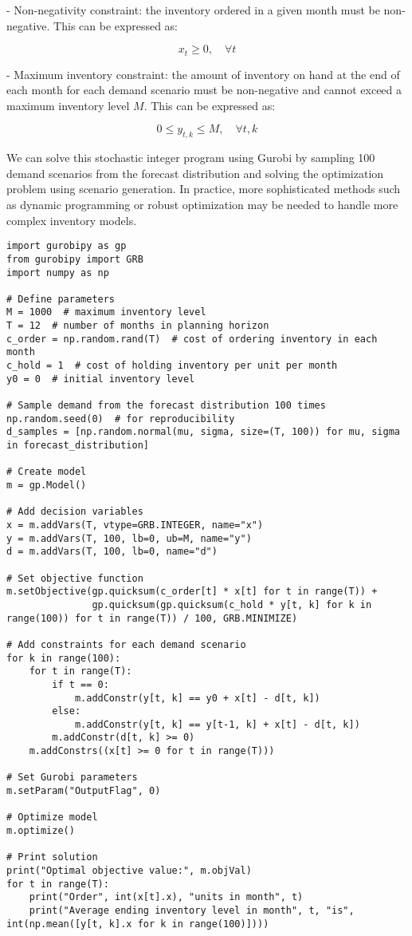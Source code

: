 - Non-negativity constraint: the inventory ordered in a given month must be non-negative. This can be expressed as:

$$x_t \geq 0, \quad \forall t$$

- Maximum inventory constraint: the amount of inventory on hand at the end of each month for each demand scenario must be non-negative and cannot exceed a maximum inventory level $M$. This can be expressed as:

$$0 \leq y_{t,k} \leq M, \quad \forall t, k$$

We can solve this stochastic integer program using Gurobi by sampling 100 demand scenarios from the forecast distribution and solving the optimization problem using scenario generation. In practice, more sophisticated methods such as dynamic programming or robust optimization may be needed to handle more complex inventory models.


\begin{verbatim}
import gurobipy as gp
from gurobipy import GRB
import numpy as np

# Define parameters
M = 1000  # maximum inventory level
T = 12  # number of months in planning horizon
c_order = np.random.rand(T)  # cost of ordering inventory in each month
c_hold = 1  # cost of holding inventory per unit per month
y0 = 0  # initial inventory level

# Sample demand from the forecast distribution 100 times
np.random.seed(0)  # for reproducibility
d_samples = [np.random.normal(mu, sigma, size=(T, 100)) for mu, sigma in forecast_distribution]

# Create model
m = gp.Model()

# Add decision variables
x = m.addVars(T, vtype=GRB.INTEGER, name="x")
y = m.addVars(T, 100, lb=0, ub=M, name="y")
d = m.addVars(T, 100, lb=0, name="d")

# Set objective function
m.setObjective(gp.quicksum(c_order[t] * x[t] for t in range(T)) +
               gp.quicksum(gp.quicksum(c_hold * y[t, k] for k in range(100)) for t in range(T)) / 100, GRB.MINIMIZE)

# Add constraints for each demand scenario
for k in range(100):
    for t in range(T):
        if t == 0:
            m.addConstr(y[t, k] == y0 + x[t] - d[t, k])
        else:
            m.addConstr(y[t, k] == y[t-1, k] + x[t] - d[t, k])
        m.addConstr(d[t, k] >= 0)
    m.addConstrs((x[t] >= 0 for t in range(T)))

# Set Gurobi parameters
m.setParam("OutputFlag", 0)

# Optimize model
m.optimize()

# Print solution
print("Optimal objective value:", m.objVal)
for t in range(T):
    print("Order", int(x[t].x), "units in month", t)
    print("Average ending inventory level in month", t, "is", int(np.mean([y[t, k].x for k in range(100)])))

\end{verbatim}


